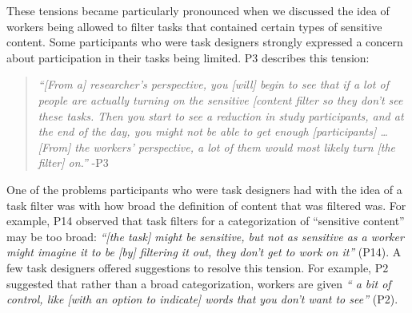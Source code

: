 These tensions became particularly pronounced when we discussed the idea of workers being allowed to filter tasks that contained certain types of sensitive content. Some participants who were task designers strongly expressed a concern about participation in their tasks being limited. P3 describes this tension:
\begin{quote}
    \textit{``[From a] researcher's perspective, you [will] begin to see that if a lot of people are actually turning on the sensitive [content filter so they don't see these tasks. Then you start to see a reduction in study participants, and at the end of the day, you might not be able to get enough [participants] \dots [From] the workers' perspective,  a lot of them would most likely turn [the filter] on.''} -P3
\end{quote} 
One of the problems participants who were task designers had with the idea of a task filter was with how broad the definition of content that was filtered was. For example, P14 observed that task filters for a categorization of ``sensitive content'' may be too broad: \textit{``[the task] might be sensitive, but not as sensitive as a worker might imagine it to be [by] filtering it out, they don't get to work on it''} (P14). A few task designers offered suggestions to resolve this tension. For example, P2 suggested that rather than a broad categorization, workers are given \textit{`` a bit of control, like [with an option to indicate] words that you don't want to see''} (P2).


